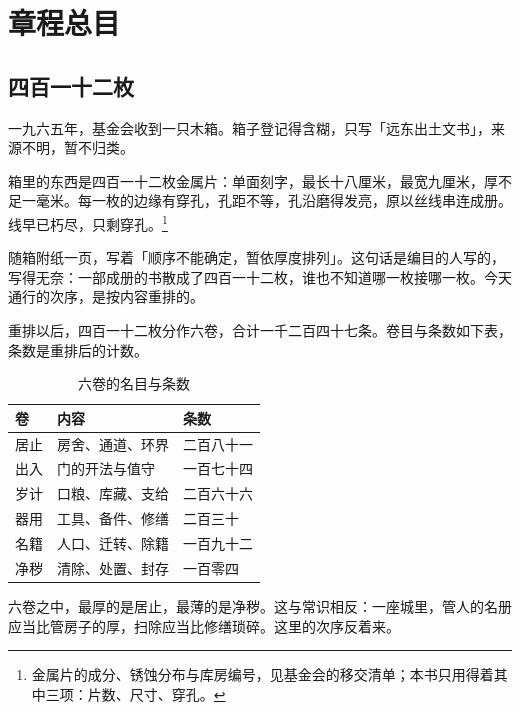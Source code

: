 \chapter{章程总目}


\section{四百一十二枚}

一九六五年，基金会收到一只木箱。箱子登记得含糊，只写「远东出土文书」，来源不明，暂不归类。

箱里的东西是四百一十二枚金属片：单面刻字，最长十八厘米，最宽九厘米，厚不足一毫米。每一枚的边缘有穿孔，孔距不等，孔沿磨得发亮，原以丝线串连成册。线早已朽尽，只剩穿孔。\footnote{金属片的成分、锈蚀分布与库房编号，见基金会的移交清单；本书只用得着其中三项：片数、尺寸、穿孔。}

随箱附纸一页，写着「顺序不能确定，暂依厚度排列」。这句话是编目的人写的，写得无奈：一部成册的书散成了四百一十二枚，谁也不知道哪一枚接哪一枚。今天通行的次序，是按内容重排的。

重排以后，四百一十二枚分作六卷，合计一千二百四十七条。卷目与条数如下表，条数是重排后的计数。

\begin{table}[htbp]
\centering
\caption{六卷的名目与条数}
\begin{tabular}{@{}lll@{}}
\toprule
卷 & 内容 & 条数\\
\midrule
居止 & 房舍、通道、环界 & 二百八十一 \\
出入 & 门的开法与值守 & 一百七十四 \\
岁计 & 口粮、库藏、支给 & 二百六十六 \\
器用 & 工具、备件、修缮 & 二百三十 \\
名籍 & 人口、迁转、除籍 & 一百九十二 \\
净秽 & 清除、处置、封存 & 一百零四 \\
\bottomrule
\end{tabular}
\end{table}

六卷之中，最厚的是居止，最薄的是净秽。这与常识相反：一座城里，管人的名册应当比管房子的厚，扫除应当比修缮琐碎。这里的次序反着来。

